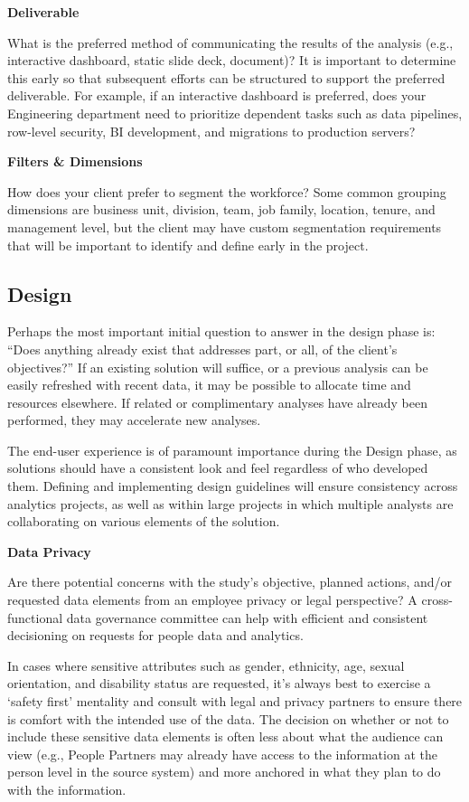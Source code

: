 \documentclass[]{book}
\begin{document}
\textbf{Deliverable}

What is the preferred method of communicating the results of the analysis (e.g., interactive dashboard, static slide deck, document)? It is important to determine this early so that subsequent efforts can be structured to support the preferred deliverable. For example, if an interactive dashboard is preferred, does your Engineering department need to prioritize dependent tasks such as data pipelines, row-level security, BI development, and migrations to production servers?

\textbf{Filters \& Dimensions}

How does your client prefer to segment the workforce? Some common grouping dimensions are business unit, division, team, job family, location, tenure, and management level, but the client may have custom segmentation requirements that will be important to identify and define early in the project.

\hypertarget{design}{%
\subsection{Design}\label{design}}

Perhaps the most important initial question to answer in the design phase is: ``Does anything already exist that addresses part, or all, of the client's objectives?'' If an existing solution will suffice, or a previous analysis can be easily refreshed with recent data, it may be possible to allocate time and resources elsewhere. If related or complimentary analyses have already been performed, they may accelerate new analyses.

The end-user experience is of paramount importance during the Design phase, as solutions should have a consistent look and feel regardless of who developed them. Defining and implementing design guidelines will ensure consistency across analytics projects, as well as within large projects in which multiple analysts are collaborating on various elements of the solution.

\textbf{Data Privacy}

Are there potential concerns with the study's objective, planned actions, and/or requested data elements from an employee privacy or legal perspective? A cross-functional data governance committee can help with efficient and consistent decisioning on requests for people data and analytics.

In cases where sensitive attributes such as gender, ethnicity, age, sexual orientation, and disability status are requested, it's always best to exercise a `safety first' mentality and consult with legal and privacy partners to ensure there is comfort with the intended use of the data. The decision on whether or not to include these sensitive data elements is often less about what the audience can view (e.g., People Partners may already have access to the information at the person level in the source system) and more anchored in what they plan to do with the information.
\end{document}
